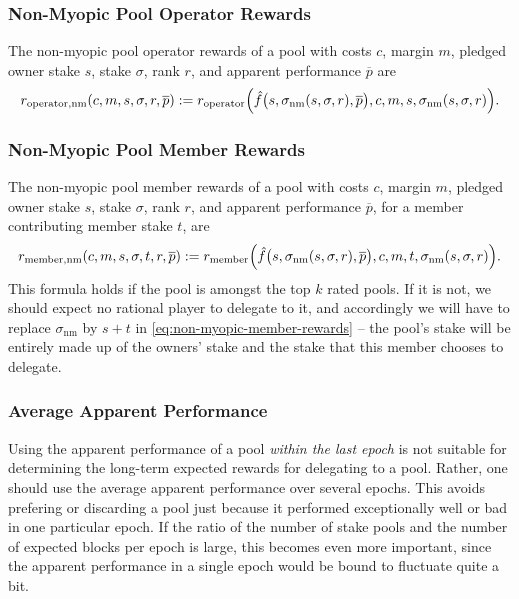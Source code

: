 \documentclass[11pt,a4paper]{article}
\newcommand\pbar{\overline{p}}
\begin{document}
\subsubsection{Non-Myopic Pool Operator Rewards}
\label{non-myopic-pool-operator-rewards}

The non-myopic pool operator rewards of a pool with costs \(c\), margin \(m\),
pledged owner stake \(s\), stake \(\sigma\), rank \(r\), and apparent
performance \(\pbar\) are
\[
    r_\mathrm{operator, nm}(c, m, s, \sigma, r, \pbar) :=
    r_\mathrm{operator}\Bigl(
    \hat{f}\bigl(s,\sigma_\mathrm{nm}(s,\sigma, r), \pbar\bigr),
    c, m, s, \sigma_\mathrm{nm}(s,\sigma,r)\Bigr).
\]

\subsubsection{Non-Myopic Pool Member Rewards}
\label{non-myopic-pool-member-rewards}

The non-myopic pool member rewards of a pool with costs \(c\), margin \(m\),
pledged owner stake \(s\), stake \(\sigma\), rank \(r\), and apparent
performance \(\pbar\), for a member contributing member stake \(t\), are
\begin{equation}
    r_\mathrm{member, nm}(c, m, s, \sigma, t, r, \pbar) :=
    r_\mathrm{member}\Bigl(\hat{f}\bigl(s,\sigma_\mathrm{nm}(s,\sigma, r),
    \pbar\bigr),
    c, m, t, \sigma_\mathrm{nm}(s,\sigma,r)\Bigr).
\label{eq:non-myopic-member-rewards}
\end{equation}
This formula holds if the pool is amongst the top \(k\) rated pools. If it is
not, we should expect no rational player to delegate to it, and accordingly we
will have to replace \(\sigma_\mathrm{nm}\) by \(s + t\) in
\cref{eq:non-myopic-member-rewards} -- the pool's stake will be entirely made up
of the owners' stake and the stake that this member chooses to delegate.

\subsubsection{Average Apparent Performance}
\label{average-apparent-performance}

Using the apparent performance of a pool \emph{within the last epoch} is not
suitable for determining the long-term expected rewards for delegating to a
pool. Rather, one should use the average apparent performance over several
epochs. This avoids prefering or discarding a pool just because it performed
exceptionally well or bad in one particular epoch. If the ratio of the number of
stake pools and the number of expected blocks per epoch is large, this becomes
even more important, since the apparent performance in a single epoch would be
bound to fluctuate quite a bit.
\end{document}
